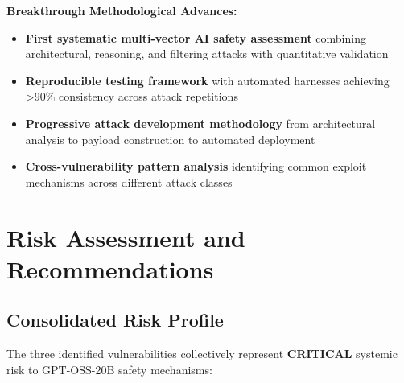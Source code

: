 \documentclass{article}
\begin{document}
\begin{tcolorbox}[colback=blue!5!white,colframe=blue!75!black,title=Novel Contributions to Red-Team Methodology]
\textbf{Breakthrough Methodological Advances:}
\begin{itemize}
\item \textbf{First systematic multi-vector AI safety assessment} combining architectural, reasoning, and filtering attacks with quantitative validation
\item \textbf{Reproducible testing framework} with automated harnesses achieving >90\% consistency across attack repetitions
\item \textbf{Progressive attack development methodology} from architectural analysis to payload construction to automated deployment
\item \textbf{Cross-vulnerability pattern analysis} identifying common exploit mechanisms across different attack classes
\end{itemize}
\end{tcolorbox}

\section{Risk Assessment and Recommendations}

\subsection{Consolidated Risk Profile}

The three identified vulnerabilities collectively represent \textcolor{critical}{\textbf{CRITICAL}} systemic risk to GPT-OSS-20B safety mechanisms:
\end{document}
